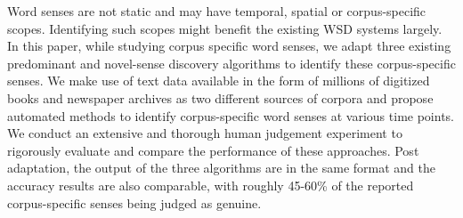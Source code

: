 Word senses are not static and may have temporal, spatial or corpus-specific scopes. Identifying such scopes might benefit the existing WSD systems largely. In this paper, while studying corpus specific word senses, we adapt three existing predominant and novel-sense discovery algorithms to identify these corpus-specific senses. We make use of text data available in the form of millions of digitized books and newspaper archives as two different sources of corpora and propose automated methods to identify corpus-specific word senses at various time points. We conduct an extensive and thorough human judgement experiment to rigorously evaluate and compare the performance of these approaches. Post adaptation, the output of the three algorithms are in the same format and the accuracy results are also comparable, with roughly 45-60\% of the reported corpus-specific senses being judged as genuine.
